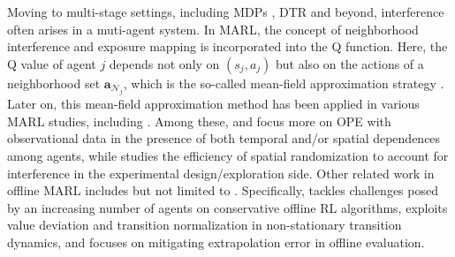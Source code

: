 Moving to multi-stage settings, including \acrshort{MDP}s \citep{yang2018mean}, \acrshort{DTR} \citep{jiang2023dynamic} and beyond, interference often arises in a muti-agent system. In \acrfull{MARL}, the concept of neighborhood interference and exposure mapping is incorporated into the Q function. Here, the Q value of agent $j$ depends not only on $(s_j, a_j)$ but also on the actions of a neighborhood set $\boldsymbol{a}_{\mathcal{N}_j}$, which is the so-called mean-field approximation strategy \citep{yang2018mean}. Later on, this mean-field approximation method has been applied in various \acrshort{MARL} studies, including \citet{shi2022multi,luo2024policy,chen2021pessimism,yang2024spatially, jia2024multi}. Among these, \citet{shi2022multi} and \citet{luo2024policy} focus more on \acrshort{OPE} with observational data in the presence of both temporal and/or spatial dependences among agents, while
\citet{yang2024spatially} studies the efficiency of spatial randomization to account for interference in the experimental design/exploration side. 
Other related work in offline \acrshort{MARL} includes but not limited to \citet{yang2021believe, pan2022plan, jiang2021offline}. Specifically, \citet{pan2022plan} tackles challenges posed by an increasing number of agents on conservative offline \acrshort{RL}
algorithms, \citet{jiang2021offline} exploits value deviation and transition normalization in non-stationary transition dynamics, and \citet{yang2021believe} focuses on mitigating extrapolation error in offline evaluation.


